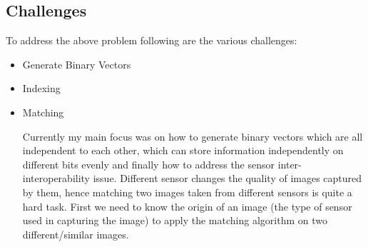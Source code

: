 \subsection{Challenges}
\label{sec:challenges}
	To address the above problem following are the various challenges:

\begin{itemize}
	\item Generate Binary Vectors
	\item Indexing
	\item Matching
    
    Currently my main focus was on how to generate binary vectors which are all independent to each other, which can store information independently on different bits evenly and finally how to address the sensor inter-interoperability issue. Different sensor changes the quality of images captured by them, hence matching two images taken from different sensors is quite a hard task. First we need to know the origin of an image (the type of sensor used in capturing the image) to apply the matching algorithm on two different/similar images. 

\end{itemize}

